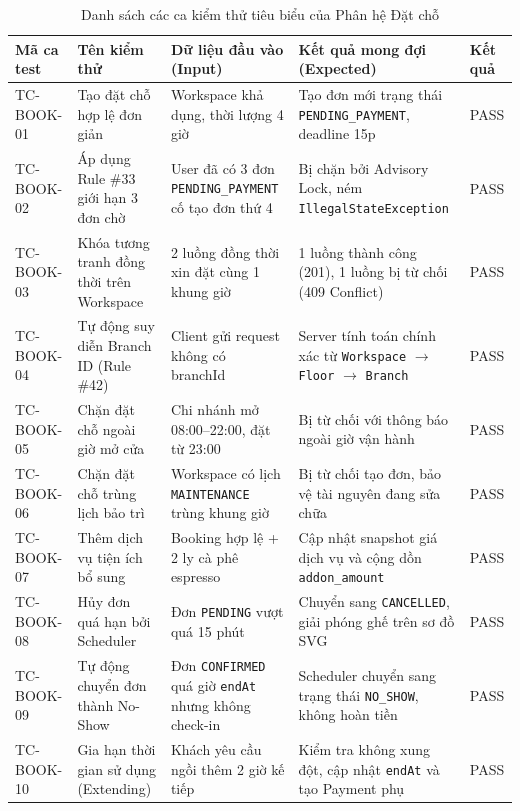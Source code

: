 \begin{table}[H]
\centering
\caption{Danh sách các ca kiểm thử tiêu biểu của Phân hệ Đặt chỗ}
\label{tab:tc-booking}
\renewcommand{\arraystretch}{1.25}
\begin{tabular}{|p{2.2cm}|p{3.5cm}|p{3.5cm}|p{4.2cm}|p{1.2cm}|}
\hline
\textbf{Mã ca test} & \textbf{Tên kiểm thử} & \textbf{Dữ liệu đầu vào (Input)} & \textbf{Kết quả mong đợi (Expected)} & \textbf{Kết quả} \\
\hline
TC-BOOK-01 & Tạo đặt chỗ hợp lệ đơn giản & Workspace khả dụng, thời lượng 4 giờ & Tạo đơn mới trạng thái \texttt{PENDING\_PAYMENT}, deadline 15p & PASS \\
\hline
TC-BOOK-02 & Áp dụng Rule \#33 giới hạn 3 đơn chờ & User đã có 3 đơn \texttt{PENDING\_PAYMENT} cố tạo đơn thứ 4 & Bị chặn bởi Advisory Lock, ném \texttt{IllegalStateException} & PASS \\
\hline
TC-BOOK-03 & Khóa tương tranh đồng thời trên Workspace & 2 luồng đồng thời xin đặt cùng 1 khung giờ & 1 luồng thành công (201), 1 luồng bị từ chối (409 Conflict) & PASS \\
\hline
TC-BOOK-04 & Tự động suy diễn Branch ID (Rule \#42) & Client gửi request không có branchId & Server tính toán chính xác từ \texttt{Workspace} $\rightarrow$ \texttt{Floor} $\rightarrow$ \texttt{Branch} & PASS \\
\hline
TC-BOOK-05 & Chặn đặt chỗ ngoài giờ mở cửa & Chi nhánh mở 08:00--22:00, đặt từ 23:00 & Bị từ chối với thông báo ngoài giờ vận hành & PASS \\
\hline
TC-BOOK-06 & Chặn đặt chỗ trùng lịch bảo trì & Workspace có lịch \texttt{MAINTENANCE} trùng khung giờ & Bị từ chối tạo đơn, bảo vệ tài nguyên đang sửa chữa & PASS \\
\hline
TC-BOOK-07 & Thêm dịch vụ tiện ích bổ sung & Booking hợp lệ + 2 ly cà phê espresso & Cập nhật snapshot giá dịch vụ và cộng dồn \texttt{addon\_amount} & PASS \\
\hline
TC-BOOK-08 & Hủy đơn quá hạn bởi Scheduler & Đơn \texttt{PENDING} vượt quá 15 phút & Chuyển sang \texttt{CANCELLED}, giải phóng ghế trên sơ đồ SVG & PASS \\
\hline
TC-BOOK-09 & Tự động chuyển đơn thành No-Show & Đơn \texttt{CONFIRMED} quá giờ \texttt{endAt} nhưng không check-in & Scheduler chuyển sang trạng thái \texttt{NO\_SHOW}, không hoàn tiền & PASS \\
\hline
TC-BOOK-10 & Gia hạn thời gian sử dụng (Extending) & Khách yêu cầu ngồi thêm 2 giờ kế tiếp & Kiểm tra không xung đột, cập nhật \texttt{endAt} và tạo Payment phụ & PASS \\
\hline
\end{tabular}
\end{table}

